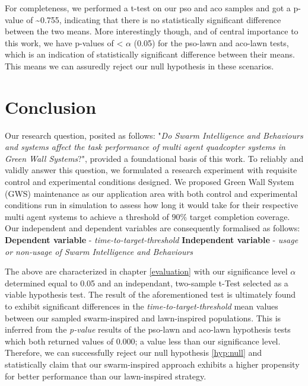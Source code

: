 \documentclass{report}
\begin{document}
    For completeness, we performed a t-test on our pso and aco samples and
got a p-value of \textasciitilde{}0.755, indicating that there is no
statistically significant difference between the two means. More
interestingly though, and of central importance to this work, we have
p-values of \textless{} \(\alpha\) (0.05) for the pso-lawn and aco-lawn
tests, which is an indication of statistically significant difference
between their means. This means we can assuredly reject our null
hypothesis in these scenarios.


\chapter{Conclusion} \label{conclusion}

Our research question, posited as follows: "\textit{Do Swarm Intelligence and Behaviours and systems affect the task performance of multi agent quadcopter systems in Green Wall Systems}?", provided a foundational basis of this work. To reliably and validly answer this question, we formulated a research experiment with requisite control and experimental conditions designed. We proposed Green Wall System (GWS) maintenance as our application area with both control and experimental conditions run in simulation to assess how long it would take for their respective multi agent systems to achieve a threshold of $90\%$ target completion coverage. Our independent and dependent variables are consequently formalised as follows:
\vskip 0.5cm
\textbf{Dependent variable} - \textit{time-to-target-threshold}
\vskip 0.1cm
\textbf{Independent variable} - \textit{usage or non-usage of Swarm Intelligence and Behaviours}
\vskip 0.5cm

The above are characterized in chapter \ref{evaluation} with our significance level $\alpha$ determined equal to 0.05 and an independant, two-sample t-Test selected as a viable hypothesis test. The result of the aforementioned test is ultimately found to exhibit significant differences in the \textit{time-to-target-threshold} mean values between our sampled swarm-inspired and lawn-inspired populations. This is inferred from the \textit{p-value} results of the pso-lawn and aco-lawn hypothesis tests which both returned values of $0.000$; a value less than our significance level. Therefore, we can successfully reject our null hypothesis \ref{hyp:null} and statistically claim that our swarm-inspired approach exhibits a higher propensity for better performance than our lawn-inspired strategy.
\end{document}
